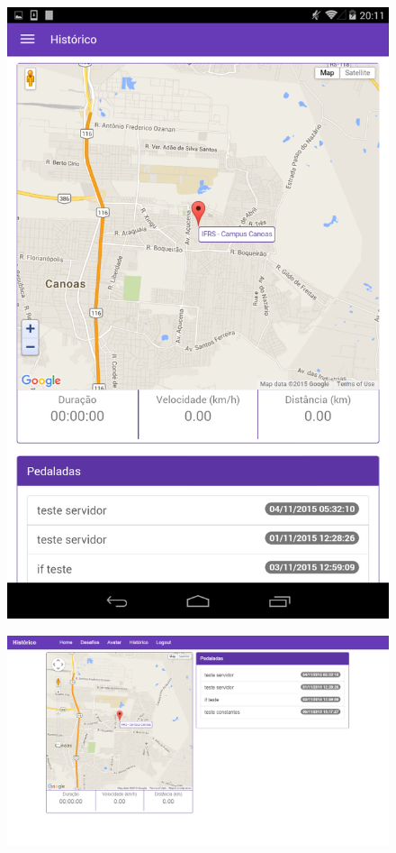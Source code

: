 \begin{figure}[h]
\begin{minipage}{.3\textwidth}
    \centering
    \includegraphics[width=0.95\linewidth]{figuras/p2pmaps.png}
    \label{fig:recordsMobile}
\end{minipage}%
\begin{minipage}{.7\textwidth}
    \centering
    \includegraphics[width=1.1\linewidth]{figuras/p2pWebMaps.png}

\end{minipage}
\end{figure}
